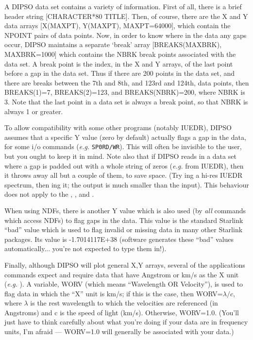 \documentclass[twoside,11pt,noabs,nolof]{starlink}
\begin{document}
A DIPSO data set contains a variety of information. First of all,
there is a brief header string [CHARACTER*80 TITLE]. Then, of course,
there are the X and Y data arrays [X(MAXPT), Y(MAXPT), MAXPT=64000],
which contain the NPOINT pairs of data points. Now, in order to know
where in the data any gaps occur, DIPSO maintains a separate `break'
array [BREAKS(MAXBRK), MAXBRK=1000] which contains the NBRK break
points associated with the data set. A break point is the index, in the
X and Y arrays, of the last point before a gap in the data set. Thus
if there are 200 points in the data set, and there are breaks between
the 7th and 8th, and 123rd and 124th, data points, then BREAKS(1)=7,
BREAKS(2)=123, and BREAKS(NBRK)=200, where NBRK is 3. Note that the
last point in a data set is always a break point, so that NBRK is
always 1 or greater.

To allow compatibility with some other programs (notably IUEDR), DIPSO
assumes that a specific Y value (zero by default) actually flags a gap
in the data, for some i/o commands (\emph{e.g.} {\texttt{SP0RD/WR}}).  This
will often be invisible to the user, but you ought to keep it in mind.
Note also that if DIPSO reads in a data set where a gap is padded out
with a whole string of zeros (\emph{e.g.} from IUEDR), then it throws
away all but a couple of them, to save space. (Try ing  a
hi-res IUEDR spectrum, then ing  it; the output is much
smaller than the input). This behaviour does not apply to the ,
,    and .

When using NDFs, there is another Y value which is also used (by \emph{all} commands which access NDFs) to flag gaps in the data. This value is
the standard Starlink ``bad'' value which is used to flag invalid or
missing data in many other Starlink packages. Its value is -1.7014117E+38
(software generates these ``bad'' values automatically... you're not
expected to type them in!).

Finally, although DIPSO will plot general X,Y arrays, several of the
applications commands expect and require data that have Angstrom or
km/s as the X unit (\emph{e.g.} ).  A variable,
WORV (which means
``Wavelength OR Velocity''), is used to flag data in which the ``X''
unit is km/s; if this is the case, then WORV=$\lambda/c$, where
$\lambda$ is the rest wavelength to which the velocities are
referenced (in Angstroms) and c is the speed of light (km/s).
Otherwise, WORV=1.0. (You'll just have to think carefully about what
you're doing if your data are in frequency units, I'm afraid ---
WORV=1.0 will generally be associated with your data.)
\end{document}
